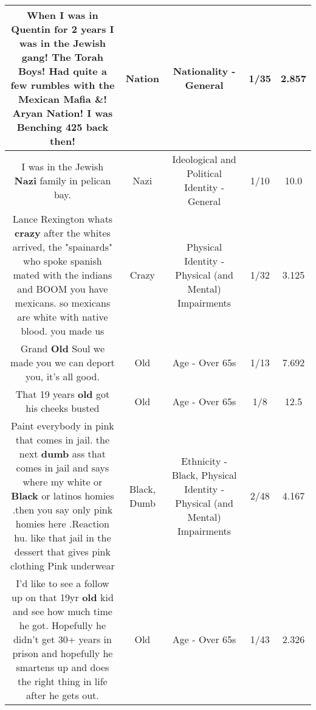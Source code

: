 \documentclass[11pt]{article}
\newlength\mylength
\begin{document}
\begin{center}
\begin{longtable}{|C{.65\mylength}|C{.30\mylength}|C{.12\mylength}|C{.12\mylength}|C{.12\mylength}|}
  \small When I was in Quentin for 2 years I was in the Jewish gang!  The Torah Boys!  Had quite a few rumbles with the Mexican Mafia \&!  Aryan \textbf{Nation}!  I was Benching 425 back then!\normalsize   & Nation & Nationality - General & 1/35 & 2.857 \\  \hline
  \small I was in the Jewish \textbf{Nazi} family in pelican bay.\normalsize   & Nazi &  Ideological and Political Identity - General & 1/10 & 10.0 \\  \hline
  \small Lance Rexington whats \textbf{crazy} after the whites arrived, the "spainards" who spoke spanish mated with the indians and BOOM you have mexicans. so mexicans are white with native blood. you made us\normalsize   & Crazy & Physical Identity - Physical (and Mental) Impairments & 1/32 & 3.125 \\  \hline
  \small Grand \textbf{Old} Soul we made you we can deport you, it's all good.\normalsize   & Old & Age - Over 65s & 1/13 & 7.692 \\  \hline
  \small That 19 years \textbf{old} got his cheeks busted\normalsize   & Old & Age - Over 65s & 1/8 & 12.5 \\  \hline
  \small Paint everybody in pink that comes in jail. the next \textbf{dumb} ass that comes in jail and says where my white or \textbf{Black} or latinos homies .then you say only pink homies here .Reaction hu. like that jail in the dessert that gives pink clothing Pink underwear\normalsize   & Black, Dumb & Ethnicity - Black, Physical Identity - Physical (and Mental) Impairments & 2/48 & 4.167 \\  \hline
  \small I'd like to see a follow up on that 19yr \textbf{old} kid and see how much time he got. Hopefully he didn't get 30+ years in prison and hopefully he smartens up and does the right thing in life after he gets out.\normalsize   & Old & Age - Over 65s & 1/43 & 2.326 \\  \hline

\end{longtable}
\end{center}
\end{document}
